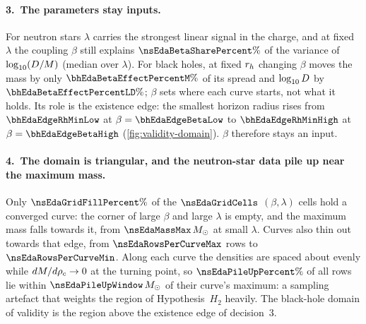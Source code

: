 \FloatBarrier

\paragraph{3.\ The parameters stay inputs.}
For neutron stars $\lambda$ carries the strongest linear signal in the charge, and at fixed $\lambda$ the coupling $\beta$ still explains $\nsEdaBetaSharePercent\%$ of the variance of $\log_{10}(D/M)$ (median over $\lambda$).
For black holes, at fixed $r_h$ changing $\beta$ moves the mass by only $\bhEdaBetaEffectPercentM\%$ of its spread and $\log_{10}D$ by $\bhEdaBetaEffectPercentLD\%$; $\beta$ sets where each curve starts, not what it holds. Its role is the existence edge: the smallest horizon radius rises from $\bhEdaEdgeRhMinLow$ at $\beta = \bhEdaEdgeBetaLow$ to $\bhEdaEdgeRhMinHigh$ at $\beta = \bhEdaEdgeBetaHigh$ (\cref{fig:validity-domain}). $\beta$ therefore stays an input.

\paragraph{4.\ The domain is triangular, and the neutron-star data pile up near the maximum mass.}
Only $\nsEdaGridFillPercent\%$ of the $\nsEdaGridCells$ $(\beta, \lambda)$ cells hold a converged curve: the corner of large $\beta$ and large $\lambda$ is empty, and the maximum mass falls towards it, from $\nsEdaMassMax\,\Msun$ at small $\lambda$. Curves also thin out towards that edge, from $\nsEdaRowsPerCurveMax$ rows to $\nsEdaRowsPerCurveMin$. Along each curve the densities are spaced about evenly while $dM/d\rho_c \to 0$ at the turning point, so $\nsEdaPileUpPercent\%$ of all rows lie within $\nsEdaPileUpWindow\,\Msun$ of their curve's maximum: a sampling artefact that weights the region of Hypothesis~$H_2$ heavily. The black-hole domain of validity is the region above the existence edge of decision~3.

